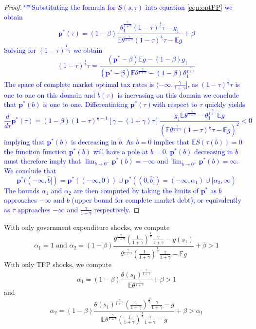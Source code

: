 \documentclass[12pt]{article}
\newcommand{\dge}[1]{\textcolor{blue}{$^{\textrm{dge}}${#1}}}
\newcommand{\EE}{\mathbb E}
\begin{document}
\begin{proof}
\dge{Substituting the formula for $S(s,\tau)$ into equation \eqref{eqn:optPP} we obtain
\[
	\bm p^*(\tau) = (1-\beta)\frac{\theta_1^\frac\gamma{1+\gamma}(1-\tau)^\frac1\gamma\tau-g_1}{\EE\theta^\frac\gamma{1+\gamma}(1-\tau)^\frac1\gamma\tau - \EE g} + \beta
\]  Solving for $(1-\tau)^\frac1\gamma\tau$ we obtain
\[
	(1-\tau)^\frac{1}{\gamma}\tau = \frac{(\bm p^*-\beta)\EE g-(1-\beta)g_1}{(\bm p^* - \beta)\EE\theta^\frac{\gamma}{1+\gamma}-(1-\beta)\theta_1^\frac{\gamma}{1+\gamma}}
\]  The space of complete market optimal tax rates is $(-\infty,\frac\gamma{1+\gamma}]$, as $(1-\tau)^\frac1\gamma\tau$ is one to one on this domain and $b(\tau)$ is increasing on this domain we conclude that $\bm p^*(b)$ is one to one. Differentiating $\bm p^*(\tau)$with respect to $\tau$ quickly yields
\[ 
	\frac{d}{d\tau} \bm p^*(\tau) = (1-\beta)(1-\tau)^{\frac1\gamma-1}\left[\gamma-(1+\gamma)\tau\right]\frac{g_1\EE\theta^\frac{\gamma}{1+\gamma}-\theta_1^\frac\gamma{1+\gamma}\EE g }{(\EE\theta^\frac\gamma{1+\gamma}(1-\tau)^\frac1\gamma\tau-\EE g)^2} <0
\] implying that $\bm p^*(b)$ is decreasing in $b$.  As $b =0$ implies that $\EE S(\tau(b)) =0$ the function function $\bm p^*(b)$ will have a pole at $b = 0$.  $\bm p^*(b)$ decreasing in $b$ must therefore imply that $\lim_{b\rightarrow0^{-} } \bm p^*(b) = -\infty$ and $\lim_{b\rightarrow 0^+} \bm p^*(b) = \infty$.  We conclude that 
\[
	\bm p^*((-\infty,\overline b]) = \bm p^*((-\infty,0))\cup \bm p^*((0,\overline b]) = (-\infty,\alpha_1)\cup[\alpha_2,\infty)
\]The bounds $\alpha_1$ and $\alpha_2$ are then computed by taking the limits of $\bm p^*$ as $b$ approaches $-\infty$ and $\overline b$ (upper bound for complete market debt), or equivalently as $\tau$ approaches $-\infty$ and $\frac\gamma{1+\gamma}$ respectively.}
\end{proof}
 With only government expenditure shocks, we compute
		\[
			\alpha_1 = 1 \text{  and }  \alpha_2 = (1-\beta)\frac{\theta^\frac{\gamma}{1+\gamma}\left(\frac{1}{1+\gamma}\right)^\frac1\gamma\frac{\gamma}{1+\gamma}-g(s_1)}{\theta^\frac{\gamma}{1+\gamma}\left(\frac{1}{1+\gamma}\right)^\frac1\gamma\frac{\gamma}{1+\gamma}-\EE g} +\beta>1
		\]
		With only TFP shocks, we compute
		\[
			\alpha_1 = (1-\beta)\frac{\theta(s_1)^\frac{\gamma}{1+\gamma}}{\EE\theta^\frac{\gamma}{1+\gamma}}+\beta > 1
		\]and
		\[
		\alpha_2 = (1-\beta)\frac{\theta(s_1)^\frac{\gamma}{1+\gamma}\left(\frac{1}{1+\gamma}\right)^\frac1\gamma\frac{\gamma}{1+\gamma}-g}{\EE\theta^\frac{\gamma}{1+\gamma}\left(\frac{1}{1+\gamma}\right)^\frac1\gamma\frac{\gamma}{1+\gamma}-g}+\beta>\alpha_1
		\]
\end{document}
